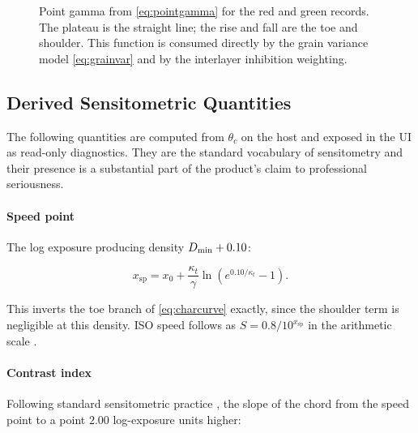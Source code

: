 \begin{figure}[htbp]
\centering
{}
\caption{Point gamma from \eqref{eq:pointgamma} for the red and green records. The plateau is the straight line; the rise and fall are the toe and shoulder. This function is consumed directly by the grain variance model \eqref{eq:grainvar} and by the interlayer inhibition weighting.}
\label{fig:pointgamma}
\end{figure}

\subsection{Derived Sensitometric Quantities}

The following quantities are computed from $\theta_c$ on the host and exposed
in the UI as read-only diagnostics. They are the standard vocabulary of
sensitometry and their presence is a substantial part of the product's claim to
professional seriousness.

\paragraph{Speed point} The log exposure producing density $D_{\min} + 0.10$:

\begin{equation}
x_{\mathrm{sp}} = x_0 + \frac{\kappa_t}{\gamma}\ln\!\left(e^{0.10/\kappa_t} - 1\right).
\label{eq:speedpoint}
\end{equation}

This inverts the toe branch of \eqref{eq:charcurve} exactly, since the shoulder
term is negligible at this density. ISO speed follows as $S = 0.8 /
10^{x_{\mathrm{sp}}}$ in the arithmetic scale \cite{iso5800,iso6}.

\paragraph{Contrast index} Following standard sensitometric practice
\cite{kodakh740}, the slope of the chord
from the speed point to a point $2.00$ log-exposure units higher:


